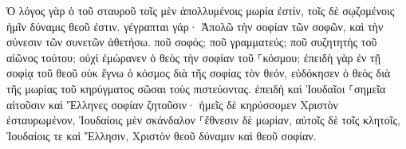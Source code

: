 \documentclass{openreader}
\begin{document}
Ὁ λόγος γὰρ ὁ τοῦ σταυροῦ τοῖς μὲν ἀπολλυμένοις μωρία ἐστίν, τοῖς δὲ σῳζομένοις ἡμῖν δύναμις θεοῦ ἐστιν. 
γέγραπται γάρ· Ἀπολῶ τὴν σοφίαν τῶν σοφῶν, καὶ τὴν σύνεσιν τῶν συνετῶν ἀθετήσω. 
ποῦ σοφός; ποῦ γραμματεύς; ποῦ συζητητὴς τοῦ αἰῶνος τούτου; οὐχὶ ἐμώρανεν ὁ θεὸς τὴν σοφίαν τοῦ ⸀κόσμου; 
ἐπειδὴ γὰρ ἐν τῇ σοφίᾳ τοῦ θεοῦ οὐκ ἔγνω ὁ κόσμος διὰ τῆς σοφίας τὸν θεόν, εὐδόκησεν ὁ θεὸς διὰ τῆς μωρίας τοῦ κηρύγματος σῶσαι τοὺς πιστεύοντας. 
ἐπειδὴ καὶ Ἰουδαῖοι ⸀σημεῖα αἰτοῦσιν καὶ Ἕλληνες σοφίαν ζητοῦσιν· 
ἡμεῖς δὲ κηρύσσομεν Χριστὸν ἐσταυρωμένον, Ἰουδαίοις μὲν σκάνδαλον ⸀ἔθνεσιν δὲ μωρίαν, 
αὐτοῖς δὲ τοῖς κλητοῖς, Ἰουδαίοις τε καὶ Ἕλλησιν, Χριστὸν θεοῦ δύναμιν καὶ θεοῦ σοφίαν. 
\end{document}

